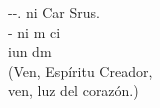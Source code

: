 \begin{cancion}%
	--. ni Car Srus.\\
	 - ni m ci\\
	iun dm\\
(Ven, Espíritu Creador,\\
 ven, luz del corazón.)\\
\end{cancion}%
